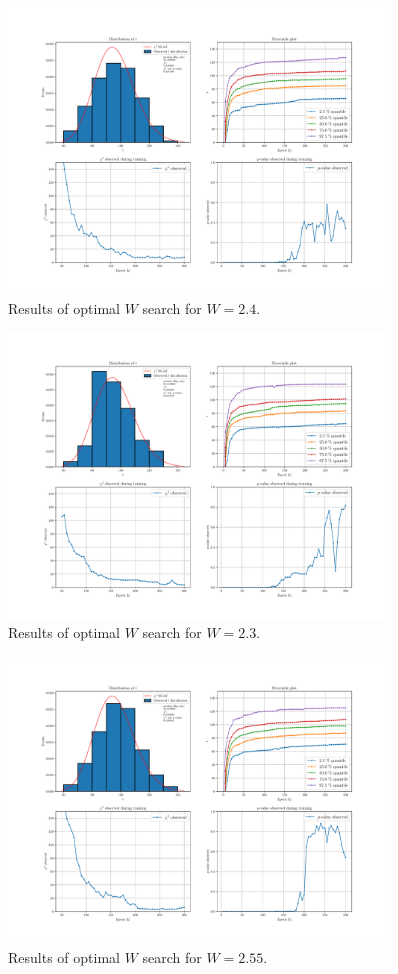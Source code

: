 \begin{figure}[H]
	\centering
	\includegraphics[width=0.9\textwidth]{Python/W_CLIP/ref200000_bkg20000_sig0/data_ref200000_bkg20000_sig0_wclip2-4.pdf}
	\caption{Results of optimal $W$ search for $W=2.4$.}
	\label{fig:REF200000_BKG20000_SIG0_WCLIP2.4}
\end{figure}

\begin{figure}[H]
	\centering
	\includegraphics[width=0.9\textwidth]{Python/W_CLIP/ref300000_bkg20000_sig0/data_ref300000_bkg20000_sig0_wclip2-3.pdf}
	\caption{Results of optimal $W$ search for $W=2.3$.}
	\label{fig:REF300000_BKG20000_SIG0_WCLIP2.3}
\end{figure}

\begin{figure}[H]
	\centering
	\includegraphics[width=0.9\textwidth]{Python/W_CLIP/ref500000_bkg20000_sig0/data_ref500000_bkg20000_sig0_wclip2-55.pdf}
	\caption{Results of optimal $W$ search for $W=2.55$.}
	\label{fig:REF500000_BKG20000_SIG0_WCLIP2.55}
\end{figure}